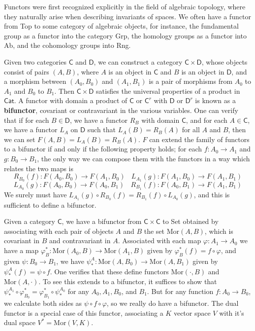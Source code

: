 \begin{example}
    Functors were first recognized explicitly in the field of algebraic topology, where they naturally arise when describing invariants of spaces. We often have a functor from {\sf Top} to some category of algebraic objects, for instance, the fundamental group as a functor into the category {\sf Grp}, the homology groups as a functor into {\sf Ab}, and the cohomology groups into {\sf Rng}.
\end{example}

Given two categories $\mathsf{C}$ and $\mathsf{D}$, we can construct a category $\mathsf{C} \times \mathsf{D}$, whose objects consist of pairs $(A,B)$, where $A$ is an object in $\mathsf{C}$ and $B$ is an object in $\mathsf{D}$, and a morphism between $(A_0, B_0)$ and $(A_1,B_1)$ is a pair of morphisms from $A_0$ to $A_1$ and $B_0$ to $B_1$. Then $\mathsf{C} \times \mathsf{D}$ satisfies the universal properties of a product in $\mathsf{Cat}$. A functor with domain a product of $\mathsf{C}$ or $\mathsf{C}^r$ with $\mathsf{D}$ or $\mathsf{D}^r$ is known as a {\bf bifunctor}, covariant or contravariant in the various variables. One can verify that if for each $B \in \mathsf{D}$, we have a functor $R_B$ with domain $\mathsf{C}$, and for each $A \in \mathsf{C}$, we have a functor $L_A$ on $\mathsf{D}$ such that $L_A(B) = R_B(A)$ for all $A$ and $B$, then we can set $F(A,B) = L_A(B) = R_B(A)$. $F$ can extend the family of functors to a bifunctor if and only if the following property holds; for each $f: A_0 \to A_1$ and $g: B_0 \to B_1$, the only way we can compose them with the functors in a way which relates the two maps is
%
\[ R_{B_0}(f): F(A_0,B_0) \to F(A_1,B_0)\ \ \ \ L_{A_1}(g): F(A_1,B_0) \to F(A_1,B_1) \]
\[ L_{A_0}(g): F(A_0,B_0) \to F(A_0,B_1)\ \ \ \ R_{B_1}(f): F(A_0,B_1) \to F(A_1,B_1) \]
%
We surely must have $L_{A_1}(g) \circ R_{B_0}(f) = R_{B_1}(f) \circ L_{A_0}(g)$, and this is sufficient to define a bifunctor.

\begin{example}
    Given a category $\mathsf{C}$, we have a bifunctor from $\mathsf{C} \times \mathsf{C}$ to {\sf Set} obtained by associating with each pair of objects $A$ and $B$ the set $\text{Mor}(A,B)$, which is covariant in $B$ and contravariant in $A$. Associated with each map $\varphi: A_1 \to A_0$ we have a map $\varphi^*_B: \text{Mor}(A_0,B) \to \text{Mor}(A_1,B)$ given by $\varphi^*_B(f) = f \circ \varphi$, and given $\psi: B_0 \to B_1$, we have $\psi_*^A: \text{Mor}(A,B_0) \to \text{Mor}(A,B_1)$ given by $\psi_*^A(f) = \psi \circ f$. One verifies that these define functors $\text{Mor}(\cdot,B)$ and $\text{Mor}(A,\cdot)$. To see this extends to a bifunctor, it suffices to show that $\psi_*^{A_1} \circ \varphi^*_{B_0} = \varphi^*_{B_1} \circ \psi_*^{A_0}$ for any $A_0,A_1,B_0$, and $B_1$. But for any function $f: A_0 \to B_0$, we calculate both sides as $\psi \circ f \circ \varphi$, so we really do have a bifunctor. The dual functor is a special case of this functor, associating a $K$ vector space $V$ with it's dual space $V^* = \text{Mor}(V,K)$.
\end{example}


